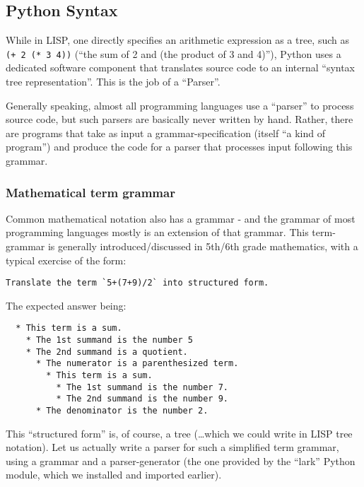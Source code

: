 \documentclass[11pt]{article}
\begin{document}
    \hypertarget{python-syntax}{%
\subsection{Python Syntax}\label{python-syntax}}

    While in LISP, one directly specifies an arithmetic expression as a
tree, such as \texttt{(+\ 2\ (*\ 3\ 4))} (``the sum of 2 and (the
product of 3 and 4)''), Python uses a dedicated software component that
translates source code to an internal ``syntax tree representation''.
This is the job of a ``Parser''.

Generally speaking, almost all programming languages use a ``parser'' to
process source code, but such parsers are basically never written by
hand. Rather, there are programs that take as input a
grammar-specification (itself ``a kind of program'') and produce the
code for a parser that processes input following this grammar.

\hypertarget{mathematical-term-grammar}{%
\subsubsection{Mathematical term
grammar}\label{mathematical-term-grammar}}

Common mathematical notation also has a grammar - and the grammar of
most programming languages mostly is an extension of that grammar. This
term-grammar is generally introduced/discussed in 5th/6th grade
mathematics, with a typical exercise of the form:

\begin{verbatim}
Translate the term `5+(7+9)/2` into structured form.
\end{verbatim}

The expected answer being:

\begin{verbatim}
  * This term is a sum.
    * The 1st summand is the number 5
    * The 2nd summand is a quotient.
      * The numerator is a parenthesized term.
        * This term is a sum.
          * The 1st summand is the number 7.
          * The 2nd summand is the number 9.
      * The denominator is the number 2.
\end{verbatim}

This ``structured form'' is, of course, a tree (\ldots which we could
write in LISP tree notation). Let us actually write a parser for such a
simplified term grammar, using a grammar and a parser-generator (the one
provided by the ``lark'' Python module, which we installed and imported
earlier).
\end{document}
